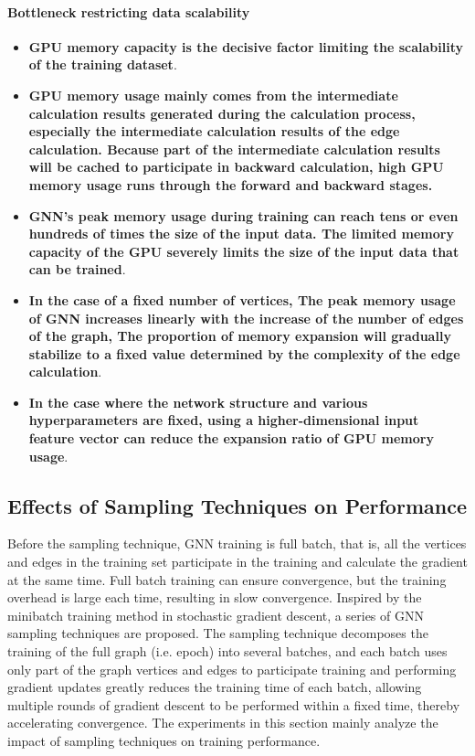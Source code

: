 \paragraph{Bottleneck restricting data scalability}
\begin{itemize}
    \item \textbf{GPU memory capacity is the decisive factor limiting the scalability of the training dataset}.
    \item \textbf{GPU memory usage mainly comes from the intermediate calculation results generated during the calculation process,
     especially the intermediate calculation results of the edge calculation. Because part of the intermediate calculation results
    will be cached to participate in backward calculation, high GPU memory usage runs through the forward and backward stages.}
    \item \textbf{GNN's peak memory usage during training can reach tens or even hundreds of times the size of the input data. The limited memory capacity of the GPU severely limits the size of the input data that can be trained}.
    \item \textbf{In the case of a fixed number of vertices, The peak memory usage of GNN increases linearly with the increase of the number of edges of the graph, The proportion of memory expansion will gradually stabilize to a fixed value determined by the complexity of the edge calculation}.
    \item \textbf{In the case where the network structure and various hyperparameters are fixed, using a higher-dimensional input feature vector can reduce the expansion ratio of GPU memory usage}.
\end{itemize}

\label{sec:memory_usage_analysis}
\subsection{Effects of Sampling Techniques on Performance}

Before the sampling technique, GNN training is full batch, that is, all the vertices and edges in the training set participate in the training and calculate the gradient at the same time.
Full batch training can ensure convergence, but the training overhead is large each time, resulting in slow convergence.
Inspired by the minibatch training method in stochastic gradient descent, a series of GNN sampling techniques are proposed.
The sampling technique decomposes the training of the full graph (i.e. epoch) into several batches, and
each batch uses only part of the graph vertices and edges to participate training and performing gradient
updates greatly reduces the training time of each batch, allowing multiple rounds of gradient descent to
be performed within a fixed time, thereby accelerating convergence. The experiments in this section mainly
analyze the impact of sampling techniques on training performance.

